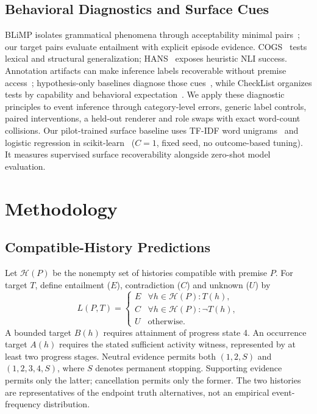\documentclass[sigconf,anonymous,review]{acmart}
\begin{document}
\subsection{Behavioral Diagnostics and Surface Cues}
BLiMP isolates grammatical phenomena through acceptability minimal pairs~\cite{blimp2020}; our target pairs evaluate entailment with explicit episode evidence. COGS~\cite{cogs2020} tests lexical and structural generalization; HANS~\cite{hans2019} exposes heuristic NLI success. Annotation artifacts can make inference labels recoverable without premise access~\cite{gururangan2018}; hypothesis-only baselines diagnose those cues~\cite{poliak2018}, while CheckList organizes tests by capability and behavioral expectation~\cite{checklist2020}. We apply these diagnostic principles to event inference through category-level errors, generic label controls, paired interventions, a held-out renderer and role swaps with exact word-count collisions. Our pilot-trained surface baseline uses TF-IDF word unigrams~\cite{salton1988} and logistic regression in scikit-learn~\cite{sklearn2011} ($C=1$, fixed seed, no outcome-based tuning). It measures supervised surface recoverability alongside zero-shot model evaluation.

\section{Methodology}
\subsection{Compatible-History Predictions}
Let $\mathcal{H}(P)$ be the nonempty set of histories compatible with premise $P$. For target $T$, define entailment ($E$), contradiction ($C$) and unknown ($U$) by
\begin{equation}
 L(P,T)=\begin{cases}
 E & \forall h\in\mathcal{H}(P):T(h),\\
 C & \forall h\in\mathcal{H}(P):\neg T(h),\\
 U & \text{otherwise}.
 \end{cases}
\end{equation}
A bounded target $B(h)$ requires attainment of progress state 4. An occurrence target $A(h)$ requires the stated sufficient activity witness, represented by at least two progress stages. Neutral evidence permits both $(1,2,S)$ and $(1,2,3,4,S)$, where $S$ denotes permanent stopping. Supporting evidence permits only the latter; cancellation permits only the former. The two histories are representatives of the endpoint truth alternatives, not an empirical event-frequency distribution.
\end{document}
